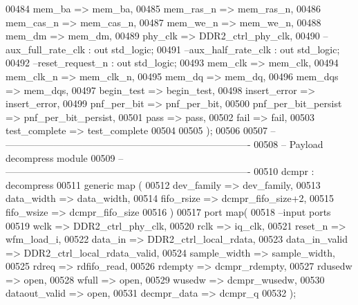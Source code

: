 \begin{DoxyCode}
00484         mem_ba                  => mem_ba,
00485         mem_ras_n               => mem_ras_n,
00486         mem_cas_n               => mem_cas_n,
00487         mem_we_n                    => mem_we_n,
00488         mem_dm                  => mem_dm,
00489         phy_clk                 => DDR2_ctrl_phy_clk,
00490 \textcolor{keyword}{        --aux\_full\_rate\_clk : out std\_logic;}
00491 \textcolor{keyword}{        --aux\_half\_rate\_clk : out std\_logic;}
00492 \textcolor{keyword}{        --reset\_request\_n   : out std\_logic;}
00493         mem_clk                 => mem_clk,
00494         mem_clk_n               => mem_clk_n,
00495         mem_dq                  => mem_dq,
00496         mem_dqs                 => mem_dqs,
00497         begin_test              => begin_test,
00498         insert_error            => insert_error,
00499         pnf_per_bit             => pnf_per_bit, 
00500         pnf_per_bit_persist  => pnf_per_bit_persist,
00501         pass                    => pass,
00502         fail                    => fail, 
00503         test_complete           => test_complete
00504     
00505     \textcolor{vhdlchar}{)};
00506      
00507 \textcolor{keyword}{-- ----------------------------------------------------------------------------}
00508 \textcolor{keyword}{-- Payload decompress module}
00509 \textcolor{keyword}{-- ----------------------------------------------------------------------------  }
00510 dcmpr :  decompress 
00511   \textcolor{keywordflow}{generic} \textcolor{keywordflow}{map}  (
00512                     dev_family => dev_family,
00513                     data_width => data_width,
00514                fifo_rsize => dcmpr\_fifo\_size+2,
00515                     fifo_wsize => dcmpr_fifo_size
00516                     \textcolor{vhdlchar}{)}
00517   \textcolor{keywordflow}{port} \textcolor{keywordflow}{map}(
00518 \textcolor{keyword}{        --input ports }
00519         wclk          => DDR2_ctrl_phy_clk,  
00520         rclk          => iq_clk, 
00521         reset_n       => wfm_load_i, 
00522         data_in       => DDR2_ctrl_local_rdata, 
00523         data_in_valid => DDR2_ctrl_local_rdata_valid, 
00524         sample_width  => sample_width,
00525         rdreq         => rdfifo_read,
00526         rdempty       => dcmpr_rdempty,
00527         rdusedw       => \textcolor{keywordflow}{open}, 
00528         wfull         => \textcolor{keywordflow}{open}, 
00529         wusedw        => dcmpr_wusedw,
00530         dataout_valid => \textcolor{keywordflow}{open},  
00531         decmpr_data   => dcmpr_q    
00532         \textcolor{vhdlchar}{)};  

\end{DoxyCode}

